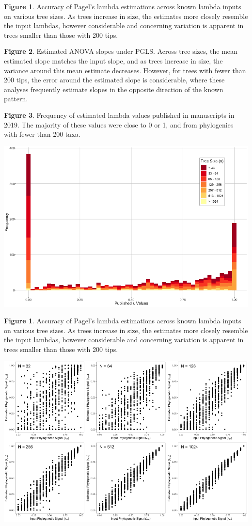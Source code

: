 \documentclass[]{article}
\begin{document}
\textbf{Figure 1}. Accuracy of Pagel's lambda estimations across known
lambda inputs on various tree sizes. As trees increase in size, the
estimates more closely resemble the input lambdas, however considerable
and concerning variation is apparent in trees smaller than those with
200 tips. \hfill\break

\textbf{Figure 2}. Estimated ANOVA slopes under PGLS. Across tree sizes,
the mean estimated slope matches the input slope, and as trees increase
in size, the variance around this mean estimate decreases. However, for
trees with fewer than 200 tips, the error around the estimated slope is
considerable, where these analyses frequently estimate slopes in the
opposite direction of the known pattern. \hfill\break

\textbf{Figure 3}. Frequency of estimated lambda values published in
manuscripts in 2019. The majority of these values were close to 0 or 1,
and from phylogenies with fewer than 200 taxa.

\newpage

\includegraphics[width=0.95\linewidth]{Fig1}

\singlespacing \textbf{Figure 1}. Accuracy of Pagel's lambda estimations
across known lambda inputs on various tree sizes. As trees increase in
size, the estimates more closely resemble the input lambdas, however
considerable and concerning variation is apparent in trees smaller than
those with 200 tips. \hfill\break

\newpage

\includegraphics[width=0.95\linewidth]{Fig2}
\end{document}
